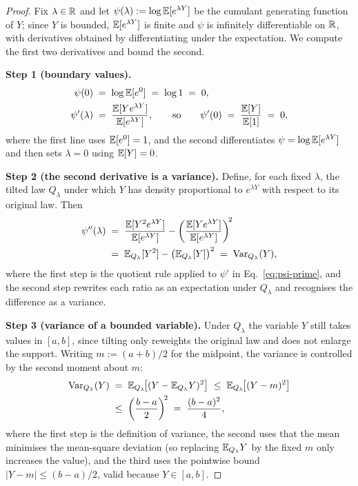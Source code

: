 \begin{proof}
Fix $\lambda \in \mathbb{R}$ and let $\psi(\lambda) := \log \mathbb{E}[e^{\lambda Y}]$ be the
cumulant generating function of $Y$; since $Y$ is bounded, $\mathbb{E}[e^{\lambda Y}]$ is
finite and $\psi$ is infinitely differentiable on $\mathbb{R}$, with derivatives
obtained by differentiating under the expectation. We compute the first two
derivatives and bound the second.

\smallskip\noindent\textbf{Step 1 (boundary values).}
\begin{align}
\psi(0) &\;=\; \log \mathbb{E}[e^{0}] \;=\; \log 1 \;=\; 0, \label{eq:psi-zero} \\
\psi'(\lambda) &\;=\; \frac{\mathbb{E}[Y e^{\lambda Y}]}{\mathbb{E}[e^{\lambda Y}]},
  \qquad\text{so}\qquad \psi'(0) \;=\; \frac{\mathbb{E}[Y]}{\mathbb{E}[1]} \;=\; 0, \label{eq:psi-prime}
\end{align}
where the first line uses $\mathbb{E}[e^0]=1$, and the second differentiates
$\psi=\log\mathbb{E}[e^{\lambda Y}]$ and then sets $\lambda=0$ using $\mathbb{E}[Y]=0$.

\smallskip\noindent\textbf{Step 2 (the second derivative is a variance).}
Define, for each fixed $\lambda$, the tilted law $Q_\lambda$ under which $Y$ has
density proportional to $e^{\lambda Y}$ with respect to its original law. Then
\begin{align}
\psi''(\lambda)
&\;=\; \frac{\mathbb{E}[Y^2 e^{\lambda Y}]}{\mathbb{E}[e^{\lambda Y}]}
       - \left( \frac{\mathbb{E}[Y e^{\lambda Y}]}{\mathbb{E}[e^{\lambda Y}]} \right)^{\!2} \notag \\
&\;=\; \mathbb{E}_{Q_\lambda}[Y^2] - \big( \mathbb{E}_{Q_\lambda}[Y] \big)^2
   \;=\; \operatorname{Var}_{Q_\lambda}(Y), \label{eq:psi-second}
\end{align}
where the first step is the quotient rule applied to $\psi'$ in
Eq.~\eqref{eq:psi-prime}, and the second step rewrites each ratio as an
expectation under $Q_\lambda$ and recognises the difference as a variance.

\smallskip\noindent\textbf{Step 3 (variance of a bounded variable).}
Under $Q_\lambda$ the variable $Y$ still takes values in $[a,b]$, since tilting
only reweights the original law and does not enlarge the support. Writing
$m := (a+b)/2$ for the midpoint, the variance is controlled by the second moment
about $m$:
\begin{align}
\operatorname{Var}_{Q_\lambda}(Y)
&\;=\; \mathbb{E}_{Q_\lambda}\!\big[(Y - \mathbb{E}_{Q_\lambda} Y)^2\big]
   \;\le\; \mathbb{E}_{Q_\lambda}\!\big[(Y - m)^2\big] \notag \\
&\;\le\; \left( \frac{b - a}{2} \right)^{\!2}
   \;=\; \frac{(b - a)^2}{4}, \label{eq:var-bound}
\end{align}
where the first step is the definition of variance, the second uses that the
mean minimises the mean-square deviation (so replacing $\mathbb{E}_{Q_\lambda} Y$ by the
fixed $m$ only increases the value), and the third uses the pointwise bound
$|Y - m| \le (b-a)/2$, valid because $Y \in [a,b]$.


\end{proof}

